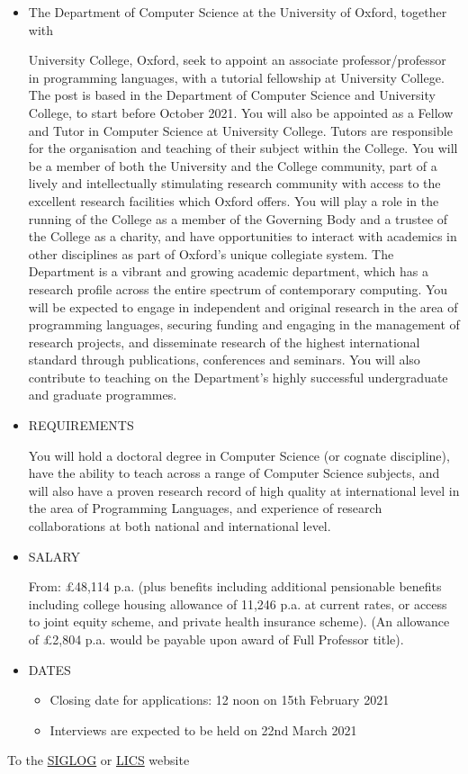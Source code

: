 \documentclass{article}
\begin{document}
\begin{itemize}\item  The Department of Computer Science at the University of Oxford, together with  
 
  University College, Oxford, seek to appoint an associate professor/professor in programming languages, with a tutorial fellowship at University College. The post is based in the Department of Computer Science and University College, to start before October 2021. You will also be appointed as a Fellow and Tutor in Computer Science at University College. Tutors are responsible for the organisation and teaching of their subject within the College. You will be a member of both the University and the College community, part of a lively and intellectually stimulating research community with access to the excellent research facilities which Oxford offers. You will play a role in the running of the College as a member of the Governing Body and a trustee of the College as a charity, and have opportunities to interact with academics in other disciplines as part of Oxford's unique collegiate system. The Department is a vibrant and growing academic department, which has a research profile across the entire spectrum of contemporary computing. You will be expected to engage in independent and original research in the area of programming languages, securing funding and engaging in the management of research projects, and disseminate research of the highest international standard through publications, conferences and seminars. You will also contribute to teaching on the Department's highly successful undergraduate and graduate programmes. 
 
\item  REQUIREMENTS 
 
  You will hold a doctoral degree in Computer Science (or cognate discipline), have the ability to teach across a range of Computer Science subjects, and will also have a proven research record of high quality at international level in the area of Programming Languages, and experience of research collaborations at both national and international level.   
 
\item  SALARY 
 
  From: £48,114 p.a. (plus benefits including additional pensionable benefits including  college housing allowance of 11,246 p.a. at current rates, or access to joint equity scheme,  and private health insurance scheme). (An allowance of £2,804 p.a. would be payable upon award of Full Professor title).  
 
\item  DATES 
 
\begin{itemize}\item  Closing date for applications: 12 noon on 15th February 2021
\item  Interviews are expected to be held on 22nd March 2021
\end{itemize} 
\end{itemize}


To the \href{http://siglog.org/}{SIGLOG} or \href{https://lics.siglog.org}{LICS} website
\end{document}
